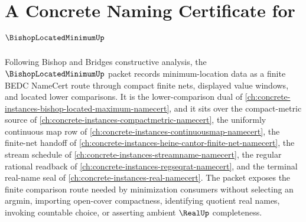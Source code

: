 \chapter{A Concrete Naming Certificate for $\BishopLocatedMinimumUp$}
\label{ch:concrete-instances-bishop-located-minimum-namecert}

Following Bishop and Bridges constructive analysis, the $\BishopLocatedMinimumUp$ packet records minimum-location data as a finite BEDC NameCert route through compact finite nets, displayed value windows, and located lower comparisons. It is the lower-comparison dual of \autoref{ch:concrete-instances-bishop-located-maximum-namecert}, and it sits over the compact-metric source of \autoref{ch:concrete-instances-compactmetric-namecert}, the uniformly continuous map row of \autoref{ch:concrete-instances-continuousmap-namecert}, the finite-net handoff of \autoref{ch:concrete-instances-heine-cantor-finite-net-namecert}, the stream schedule of \autoref{ch:concrete-instances-streamname-namecert}, the regular rational readback of \autoref{ch:concrete-instances-regseqrat-namecert}, and the terminal real-name seal of \autoref{ch:concrete-instances-real-namecert}. The packet exposes the finite comparison route needed by minimization consumers without selecting an argmin, importing open-cover compactness, identifying quotient real names, invoking countable choice, or asserting ambient $\RealUp$ completeness.

